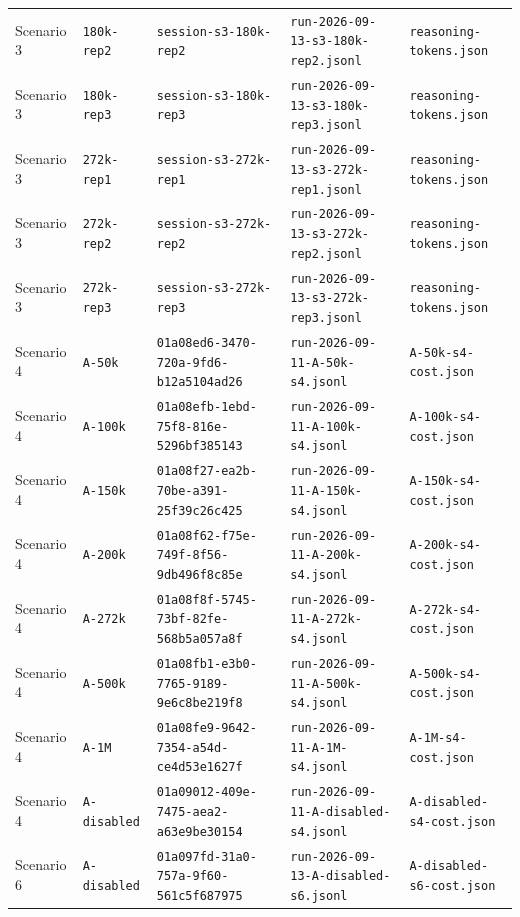 \documentclass[10pt,twocolumn,a4paper]{article}
\begin{document}
\begin{table}[t]
\begin{tabular}{@{}p{18mm}p{18mm}p{54mm}p{45mm}p{30mm}@{}}
Scenario 3 & \texttt{180k-rep2} & {\tiny\texttt{session-s3-180k-rep2}} & {\tiny\texttt{run-2026-09-13-s3-180k-rep2.jsonl}} & {\tiny\texttt{reasoning-tokens.json}} \\
Scenario 3 & \texttt{180k-rep3} & {\tiny\texttt{session-s3-180k-rep3}} & {\tiny\texttt{run-2026-09-13-s3-180k-rep3.jsonl}} & {\tiny\texttt{reasoning-tokens.json}} \\
Scenario 3 & \texttt{272k-rep1} & {\tiny\texttt{session-s3-272k-rep1}} & {\tiny\texttt{run-2026-09-13-s3-272k-rep1.jsonl}} & {\tiny\texttt{reasoning-tokens.json}} \\
Scenario 3 & \texttt{272k-rep2} & {\tiny\texttt{session-s3-272k-rep2}} & {\tiny\texttt{run-2026-09-13-s3-272k-rep2.jsonl}} & {\tiny\texttt{reasoning-tokens.json}} \\
Scenario 3 & \texttt{272k-rep3} & {\tiny\texttt{session-s3-272k-rep3}} & {\tiny\texttt{run-2026-09-13-s3-272k-rep3.jsonl}} & {\tiny\texttt{reasoning-tokens.json}} \\
\midrule
Scenario 4 & \texttt{A-50k} & {\tiny\texttt{01a08ed6-3470-720a-9fd6-b12a5104ad26}} & {\tiny\texttt{run-2026-09-11-A-50k-s4.jsonl}} & {\tiny\texttt{A-50k-s4-cost.json}} \\
Scenario 4 & \texttt{A-100k} & {\tiny\texttt{01a08efb-1ebd-75f8-816e-5296bf385143}} & {\tiny\texttt{run-2026-09-11-A-100k-s4.jsonl}} & {\tiny\texttt{A-100k-s4-cost.json}} \\
Scenario 4 & \texttt{A-150k} & {\tiny\texttt{01a08f27-ea2b-70be-a391-25f39c26c425}} & {\tiny\texttt{run-2026-09-11-A-150k-s4.jsonl}} & {\tiny\texttt{A-150k-s4-cost.json}} \\
Scenario 4 & \texttt{A-200k} & {\tiny\texttt{01a08f62-f75e-749f-8f56-9db496f8c85e}} & {\tiny\texttt{run-2026-09-11-A-200k-s4.jsonl}} & {\tiny\texttt{A-200k-s4-cost.json}} \\
Scenario 4 & \texttt{A-272k} & {\tiny\texttt{01a08f8f-5745-73bf-82fe-568b5a057a8f}} & {\tiny\texttt{run-2026-09-11-A-272k-s4.jsonl}} & {\tiny\texttt{A-272k-s4-cost.json}} \\
Scenario 4 & \texttt{A-500k} & {\tiny\texttt{01a08fb1-e3b0-7765-9189-9e6c8be219f8}} & {\tiny\texttt{run-2026-09-11-A-500k-s4.jsonl}} & {\tiny\texttt{A-500k-s4-cost.json}} \\
Scenario 4 & \texttt{A-1M} & {\tiny\texttt{01a08fe9-9642-7354-a54d-ce4d53e1627f}} & {\tiny\texttt{run-2026-09-11-A-1M-s4.jsonl}} & {\tiny\texttt{A-1M-s4-cost.json}} \\
Scenario 4 & \texttt{A-disabled} & {\tiny\texttt{01a09012-409e-7475-aea2-a63e9be30154}} & {\tiny\texttt{run-2026-09-11-A-disabled-s4.jsonl}} & {\tiny\texttt{A-disabled-s4-cost.json}} \\
\midrule
Scenario 6 & \texttt{A-disabled} & {\tiny\texttt{01a097fd-31a0-757a-9f60-561c5f687975}} & {\tiny\texttt{run-2026-09-13-A-disabled-s6.jsonl}} & {\tiny\texttt{A-disabled-s6-cost.json}} \\
\bottomrule
\end{tabular}
\end{table}
\end{document}
